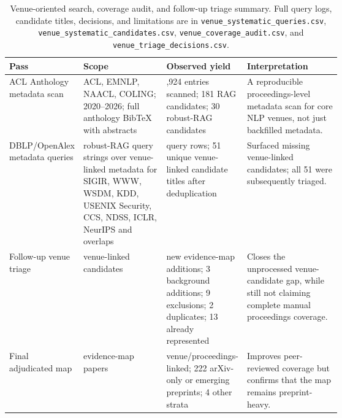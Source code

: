 \begin{table}[t]
\centering
\scriptsize
\renewcommand{\arraystretch}{0.94}
\begin{tabularx}{\linewidth}{>{\raggedright\arraybackslash}p{0.20\linewidth}>{\raggedright\arraybackslash}p{0.25\linewidth}>{\raggedright\arraybackslash}p{0.18\linewidth}X}
\toprule
\textbf{Pass} & \textbf{Scope} & \textbf{Observed yield} & \textbf{Interpretation} \\
\midrule
ACL Anthology metadata scan & ACL, EMNLP, NAACL, COLING; 2020--2026; full anthology BibTeX with abstracts & 12,924 entries scanned; 181 RAG candidates; 30 robust-RAG candidates & A reproducible proceedings-level metadata scan for core NLP venues, not just backfilled metadata. \\
DBLP/OpenAlex metadata queries & 15 robust-RAG query strings over venue-linked metadata for SIGIR, WWW, WSDM, KDD, USENIX Security, CCS, NDSS, ICLR, NeurIPS and overlaps & 31 query rows; 51 unique venue-linked candidate titles after deduplication & Surfaced missing venue-linked candidates; all 51 were subsequently triaged. \\
Follow-up venue triage & 51 venue-linked candidates & 23 new evidence-map additions; 3 background additions; 9 exclusions; 2 duplicates; 13 already represented & Closes the unprocessed venue-candidate gap, while still not claiming complete manual proceedings coverage. \\
Final adjudicated map & 268 evidence-map papers & 42 venue/proceedings-linked; 222 arXiv-only or emerging preprints; 4 other strata & Improves peer-reviewed coverage but confirms that the map remains preprint-heavy. \\
\bottomrule
\end{tabularx}
\caption{Venue-oriented search, coverage audit, and follow-up triage summary. Full query logs, candidate titles, decisions, and limitations are in \texttt{venue\_systematic\_queries.csv}, \texttt{venue\_systematic\_candidates.csv}, \texttt{venue\_coverage\_audit.csv}, and \texttt{venue\_triage\_decisions.csv}.}
\label{tab:venue-pass-summary}
\end{table}
